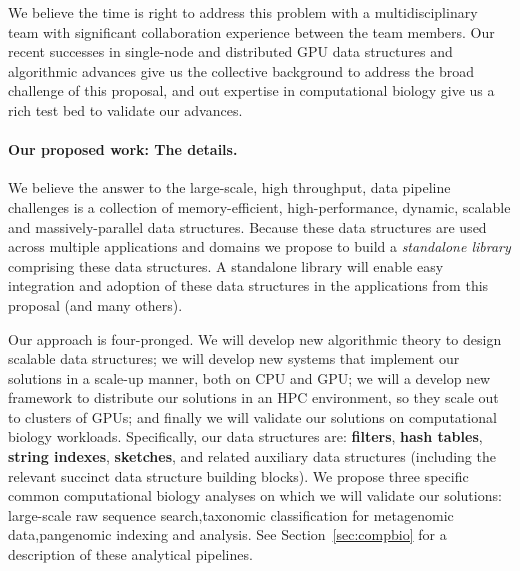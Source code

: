  We believe the time is right to address this problem with a multidisciplinary
team with significant collaboration experience between the team members. Our
recent successes in single-node and distributed GPU data structures and
algorithmic advances give us the
collective background to address the broad challenge of this proposal, and out expertise in computational biology give us a rich test bed to validate our advances.


\paragraph{Our proposed work: The details.}
We believe the answer to the large-scale, high throughput, data pipeline challenges is a collection of  memory-efficient,
high-performance, dynamic, scalable and massively-parallel data structures.
Because these data structures are used across multiple applications and domains
we propose to build a \emph{standalone library} comprising these data
structures.
 A standalone library will enable easy integration and adoption of
these data structures in the applications from this proposal (and many others).

{Our approach is four-pronged.}  We will develop new {algorithmic
theory} to design scalable data structures; we will develop new {systems} that
implement our solutions in a scale-up manner,  both on CPU and GPU\@; we will a
develop new framework to distribute our solutions in an {HPC} environment, so
they scale out to clusters of GPUs; and finally we will validate our solutions
on {computational biology} workloads.
%
Specifically, our data structures are: \textbf{filters}, \textbf{hash tables},
\textbf{string indexes}, \textbf{sketches}, and related auxiliary data
structures (including the relevant succinct data structure building blocks).   We propose three specific common computational biology analyses on
which we will validate our solutions: {large-scale raw sequence
search},{taxonomic classification for metagenomic data},{pangenomic indexing
and analysis}.   See Section~\ref{sec:compbio} for a description of these
analytical pipelines.


